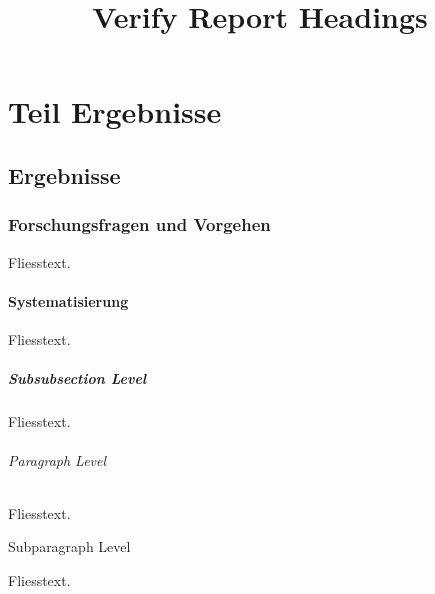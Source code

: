 \documentclass[type=report,theme=light,language=de]{semio}
\title{Verify Report Headings}
\begin{document}
\part{Teil Ergebnisse}
\chapter{Ergebnisse}
\section{Forschungsfragen und Vorgehen}
Fliesstext.
\subsection{Systematisierung}
Fliesstext.
\subsubsection{Subsubsection Level}
Fliesstext.
\paragraph{Paragraph Level}
Fliesstext.
\subparagraph{Subparagraph Level}
Fliesstext.
\end{document}
